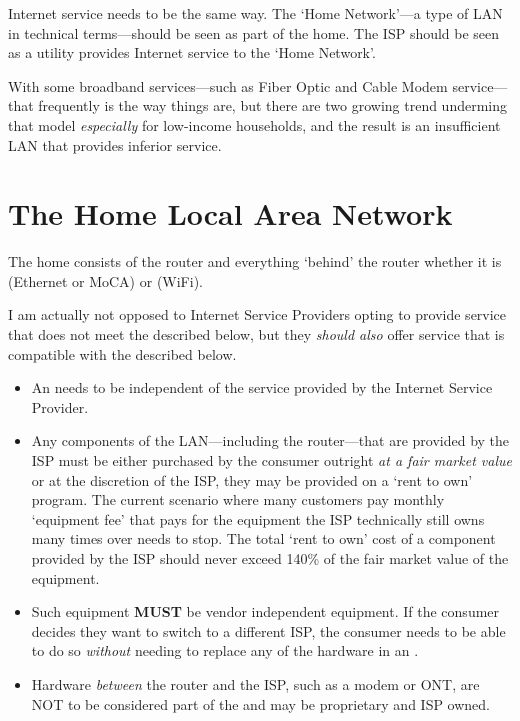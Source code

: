 Internet service needs to be the same way. The `Home Network'---a type of LAN in technical terms---should
be seen as part of the home. The ISP should be seen as a utility provides Internet service to the `Home Network'.

With some broadband services---such as Fiber Optic and Cable Modem service---that frequently is
the way things are, but there are two growing trend underming that model \emph{especially} for
low-income households, and the result is an insufficient LAN that provides inferior service.

\section{The Home Local Area Network}

The home  consists of the router and everything `behind' the router
whether it is  (Ethernet or MoCA) or  (WiFi).

I am actually not opposed to Internet Service Providers opting to provide service that does not meet
the  described below, but they \emph{should also} offer service that is compatible
with the  described below.

\begin{itemize}
  \item An  needs to be independent of the service provided by the Internet
Service Provider.
  \item Any components of the LAN---including the router---that are provided by the ISP must be either
        purchased by the consumer outright \emph{at a fair market value} or at the discretion of the ISP,
        they may be provided on a `rent to own' program. The current scenario where many customers
        pay monthly `equipment fee' that pays for the equipment the ISP technically still owns many times over
        needs to stop. The total `rent to own' cost of a component provided by the ISP should never exceed
        140\% of the fair market value of the equipment.
  \item Such  equipment \textbf{MUST} be vendor independent equipment. If the consumer
        decides they want to switch to a different ISP, the consumer needs to be able to do so \emph{without}
        needing to replace any of the hardware in an .
  \item Hardware \emph{between} the router and the ISP, such as a modem or ONT, are NOT to be considered
        part of the  and may be proprietary and ISP owned.
\end{itemize}


